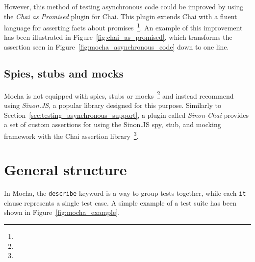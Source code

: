 {{		However, this method of testing asynchronous code could be improved by using the \emph{Chai as Promised} plugin for Chai. This plugin extends Chai with a fluent language for asserting facts about promises~\footnote{}. An example of this improvement has been illustrated in Figure~\ref{fig:chai_as_promised}, which transforms the assertion seen in Figure~\ref{fig:mocha_asynchronous_code} down to one line.

		

	}

	\subsection{Spies, stubs and mocks} {
	\label{sec:testing_spy_stub_mock_support}

		Mocha is not equipped with spies, stubs or mocks~\footnote{} and instead recommend using \emph{Sinon.JS}, a popular library designed for this purpose. Similarly to Section~\ref{sec:testing_asynchronous_support}, a plugin called \emph{Sinon-Chai} provides a set of custom assertions for using the Sinon.JS spy, stub, and mocking framework with the Chai assertion library~\footnote{}.

	}

}

\section{General structure} {
\label{sec:testing_structure}

	In Mocha, the \texttt{describe} keyword is a way to group tests together, while each \texttt{it} clause represents a single test case. A simple example of a test suite has been shown in Figure~\ref{fig:mocha_example}.

	

}

